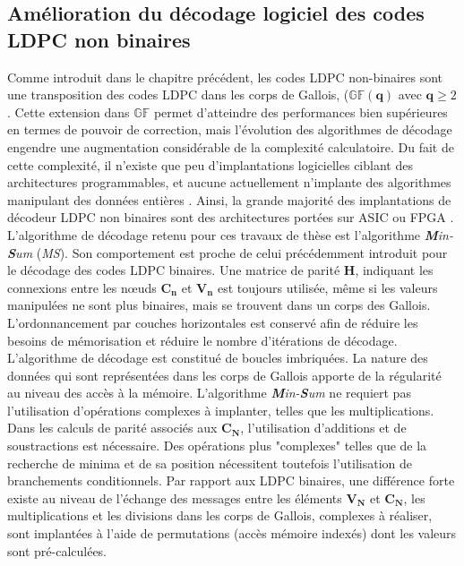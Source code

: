 \documentclass[../main.tex]{subfiles}
\begin{document}
\subsection{Amélioration du décodage logiciel des codes LDPC non binaires}
%
%
%
%
Comme introduit dans le chapitre précédent, les codes LDPC non-binaires sont une transposition des codes LDPC dans les corps de Gallois, ($\mathbb{GF}(\bm{q})$ avec $\bm{q} \ge 2$. Cette extension dans $\mathbb{GF}$ permet d'atteindre des performances bien supérieures en termes de pouvoir de correction, mais l'évolution des algorithmes de décodage engendre une augmentation considérable de la complexité calculatoire. Du fait de cette complexité, il n'existe que peu d'implantations logicielles ciblant des architectures programmables, et aucune actuellement n'implante des algorithmes manipulant des données entières \cite{14, BLG:LDPC:NB}. Ainsi, la grande majorité des implantations de décodeur LDPC non binaires sont des architectures portées sur ASIC ou FPGA \cite{survey:NB}. L’algorithme de décodage retenu pour ces travaux de thèse est l'algorithme \textit{\textbf{M}in-\textbf{S}um} (\textit{MS}). Son comportement est proche de celui précédemment introduit pour le décodage des codes LDPC binaires. Une matrice de parité $\bm{H}$, indiquant les connexions entre les nœuds $\bm{C_n}$ et $\bm{V_n}$ est toujours utilisée, même si les valeurs manipulées ne sont plus binaires, mais se trouvent dans un corps des Gallois. L'ordonnancement par couches horizontales est conservé afin de réduire les besoins de mémorisation et réduire le nombre d'itérations de décodage.
L'algorithme de décodage est constitué de boucles imbriquées. La nature des données qui sont représentées dans les corps de Gallois apporte de la régularité au niveau des accès à la mémoire. L'algorithme \textit{\textbf{M}in-\textbf{S}um} ne requiert pas l'utilisation d'opérations complexes à implanter, telles que les multiplications. 
Dans les calculs de parité associés aux $\bm{C_N}$, l'utilisation d'additions et de soustractions est nécessaire. Des opérations plus "complexes" telles que de la recherche de minima et de sa position nécessitent toutefois l'utilisation de branchements conditionnels. Par rapport aux LDPC binaires, une différence forte existe au niveau de l'échange des messages entre les éléments $\bm{V_N}$ et $\bm{C_N}$, les multiplications et les divisions dans les corps de Gallois, complexes à réaliser, sont implantées à l'aide de permutations (accès mémoire indexés) dont les valeurs sont pré-calculées.
\end{document}

